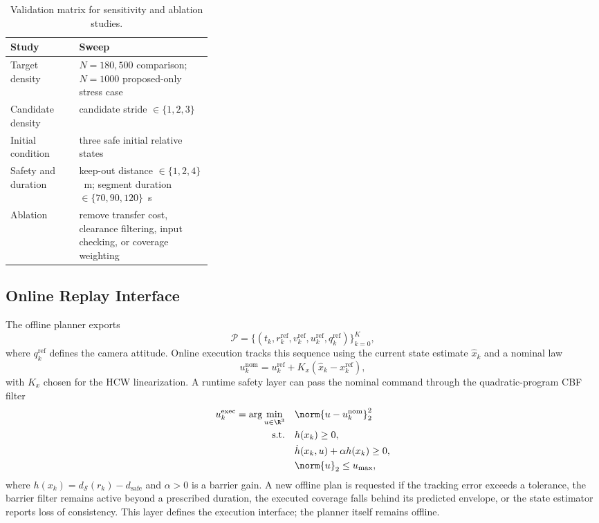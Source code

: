 \begin{table}[t]
  \centering
  \caption{Validation matrix for sensitivity and ablation studies.}
  \label{tab:validation-matrix}
  \renewcommand{\arraystretch}{1.05}
  \setlength{\tabcolsep}{4.0pt}
  \begin{tabularx}{\linewidth}{@{}>{\RaggedRight\arraybackslash}p{0.34\linewidth}>{\RaggedRight\arraybackslash}X@{}}
    \toprule
    Study & Sweep \\
    \midrule
    Target density & $N=180,500$ comparison; $N=1000$ proposed-only stress case \\
    Candidate density & candidate stride $\in\{1,2,3\}$ \\
    Initial condition & three safe initial relative states \\
    Safety and duration & keep-out distance $\in\{1,2,4\}$~m; segment duration
    $\in\{70,90,120\}$~s \\
    Ablation & remove transfer cost, clearance filtering, input checking, or
    coverage weighting \\
    \bottomrule
  \end{tabularx}
\end{table}

\subsection{Online Replay Interface}

The offline planner exports
\begin{equation}
  \mathcal{P}=\{(t_k,r_k^{\mathrm{ref}},v_k^{\mathrm{ref}},u_k^{\mathrm{ref}},
  q_k^{\mathrm{ref}})\}_{k=0}^{K},
\end{equation}
where $q_k^{\mathrm{ref}}$ defines the camera attitude. Online execution
tracks this sequence using the current state estimate $\hat{x}_k$ and a
nominal law
\begin{equation}
  u_k^{\mathrm{nom}} = u_k^{\mathrm{ref}} + K_x(\hat{x}_k - x_k^{\mathrm{ref}}),
\end{equation}
with $K_x$ chosen for the HCW linearization. A runtime safety layer can pass
the nominal command through the quadratic-program CBF filter
\begin{align}
  u_k^{\mathrm{exec}} = \arg\min_{u \in \R^3}\quad & \norm{u-u_k^{\mathrm{nom}}}_2^2 \\
  \mathrm{s.t.}\quad &
  h(x_k) \ge 0, \nonumber\\
  & \dot{h}(x_k,u) + \alpha h(x_k) \ge 0, \nonumber\\
  & \norm{u}_2 \le u_{\max}, \nonumber
\end{align}
where $h(x_k)=d_{\mathcal S}(r_k)-d_{\mathrm{safe}}$ and $\alpha>0$ is a
barrier gain. A new offline plan is requested if the tracking error exceeds a
tolerance, the barrier filter remains active beyond a prescribed duration, the
executed coverage falls behind its predicted envelope, or the state estimator
reports loss of consistency. This layer defines the execution interface; the
planner itself remains offline.

